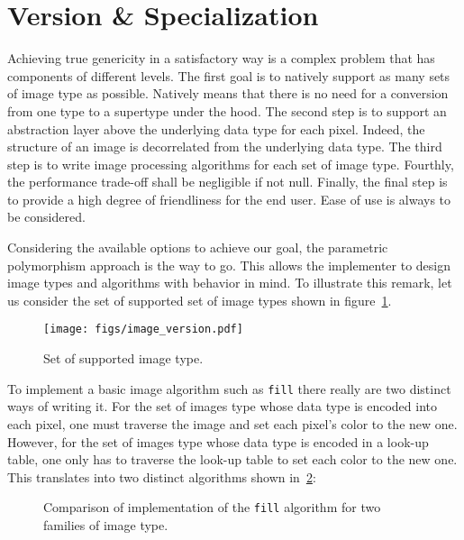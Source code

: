 
\section{Version \& Specialization}

Achieving true genericity in a satisfactory way is a complex problem that has components of different levels. The first
goal is to natively support as many sets of image type as possible. Natively means that there is no need for a
conversion from one type to a supertype under the hood. The second step is to support an abstraction layer above the
underlying data type for each pixel. Indeed, the structure of an image is decorrelated from the underlying data type.
The third step is to write image processing algorithms for each set of image type. Fourthly, the performance trade-off
shall be negligible if not null. Finally, the final step is to provide a high degree of friendliness for the end user.
Ease of use is always to be considered.

Considering the available options to achieve our goal, the parametric polymorphism approach is the way to go. This
allows the implementer to design image types and algorithms with behavior in mind. To illustrate this remark, let us
consider the set of supported set of image types shown in figure~\ref{fig.image.version}.

\begin{figure}[tbh]
  \centering
  \texttt{[image: figs/image\_version.pdf]}
  \caption{Set of supported image type.}
  \label{fig.image.version}
\end{figure}

To implement a basic image algorithm such as \texttt{fill} there really are two distinct ways of writing it. For the
set of images type whose data type is encoded into each pixel, one must traverse the image and set each pixel's color
to the new one. However, for the set of images type whose data type is encoded in a look-up table, one only has to
traverse the look-up table to set each color to the new one. This translates into two distinct algorithms shown
in~\cref{traverse.vs.LUT}:

\begin{figure}[tbh]
  \centering
  \scriptsize
  \hfil

  \caption{Comparison of implementation of the \texttt{fill} algorithm for two
    families of image type.}
  \label{traverse.vs.LUT}
\end{figure}

